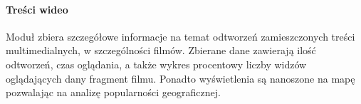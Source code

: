 \paragraph{Treści wideo}
Moduł zbiera szczegółowe informacje na temat odtworzeń zamieszczonych treści multimedialnych, w szczególności filmów. Zbierane dane zawierają ilość odtworzeń, czas oglądania, a także wykres procentowy liczby widzów oglądających dany fragment filmu. Ponadto wyświetlenia są nanoszone na mapę pozwalając na analizę popularności geograficznej.
